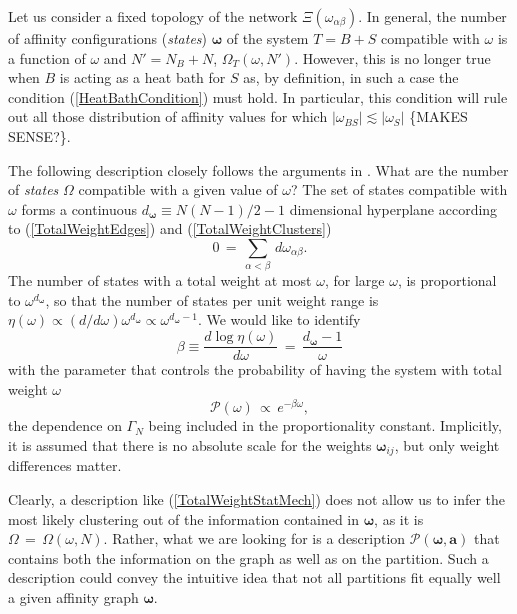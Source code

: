\documentclass[twocolumn,aps,sort,nofootinbib]{revtex4}
\begin{document}
Let us consider a fixed topology of the network $\Xi(\omega_{\alpha\beta})$.
In general, the number of affinity configurations ({\sl states}) $\boldsymbol{\omega}$ 
of the system $T=B+S$ compatible
with $\omega$ is a function of $\omega$ and $N'=N_B+N$, $\Omega_T(\omega,N')$.
However, this is no longer true when $B$ is acting as a heat bath for $S$
as, by definition, in such a case the condition (\ref{HeatBathCondition})
must hold. In particular, this condition will rule out all those distribution of affinity values
for which $|\omega_{BS}|\lesssim|\omega_S|$ \{MAKES SENSE?\}.


The following description closely follows the arguments in \cite{FeynmanStatMech}.
What are the number of {\sl states} $\Omega$ compatible with a given value of $\omega$?
The set of states compatible with $\omega$ forms a continuous $d_{\boldsymbol{\omega}}\equiv N(N-1)/2-1$ 
dimensional hyperplane according to 
(\ref{TotalWeightEdges}) and (\ref{TotalWeightClusters})
\begin{equation}
0\,=\,\sum_{\alpha<\beta}\,d\omega_{\alpha\beta}.
\label{OmegaMicrocanonical}
\end{equation}
The number of states with a total weight at most $\omega$, for large $\omega$, 
is proportional to $\omega^{d_{\boldsymbol{\omega}}}$, so that the number of states per unit 
weight range is 
$\eta (\omega) \propto (d/d\omega)\omega^{d_{\boldsymbol{\omega}}} \propto \omega^{d_{\boldsymbol{\omega}} -1}$.
We would like to identify 
\begin{equation}
\beta\equiv \frac{d\log\eta(\omega )}{d\omega}\,=\,\frac{d_{\boldsymbol{\omega}} -1}{\omega}
\end{equation}
with the parameter that controls the probability of having the system with
total weight $\omega$
\begin{equation}
\mathcal{P}(\omega)\,\propto\,e^{-\beta \omega},
\label{TotalWeightStatMech}
\end{equation}
the dependence on $\Gamma_N$ being  included in the proportionality constant.
Implicitly, it is assumed that there is no absolute scale for the weights 
$\boldsymbol{\omega}_{ij}$, but only weight differences matter.

Clearly, %
a description like (\ref{TotalWeightStatMech}) does not allow us to 
infer the most likely clustering
out of the information contained in $\boldsymbol{\omega}$, as it is
$\Omega\,=\,\Omega (\omega, N)$. Rather, what we
are looking for is a description $\mathcal{P}(\boldsymbol{\omega},\boldsymbol{a})$ that
contains both the information on the graph as well as on the partition. Such a 
description could convey the intuitive idea that not all partitions fit equally well a given
affinity graph $\boldsymbol{\omega}$.
\end{document}
